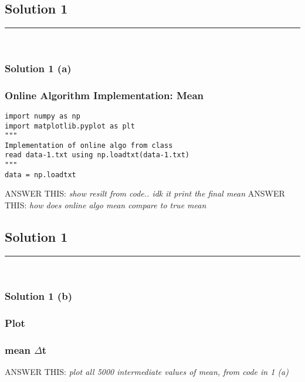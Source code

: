 \documentclass{article}
\begin{document}
\pagestyle{fancy}

\subsection*{Solution 1}
\noindent\rule{\textwidth}{0.4pt}\\

\subsubsection*{Solution 1 (a)}
\subsubsection*{Online Algorithm Implementation: Mean}

\begin{lstlisting}
import numpy as np
import matplotlib.pyplot as plt
"""
Implementation of online algo from class
read data-1.txt using np.loadtxt(data-1.txt)
"""
data = np.loadtxt
\end{lstlisting}

\parbox{\textwidth}{
ANSWER THIS: \textit{show resilt from code.. idk it print the final mean}
ANSWER THIS: \textit{how does online algo mean compare to true mean}
}

\newpage

\subsection*{Solution 1}
\noindent\rule{\textwidth}{0.4pt}\\
\subsubsection*{Solution 1 (b)}
\subsubsection*{Plot}
\subsubsection*{mean $\Delta$t}
\parbox{\textwidth}{
ANSWER THIS: \textit{plot all 5000 intermediate values of mean, from code in 1 (a)}

}
\begin{comment}
  \begin{figure}[h]
  \texttt{[image: raw\_pixel.png]}
  \caption{First five correct/incorrect images for Raw Pixel}
\end{figure}
\end{comment}
\end{document}
